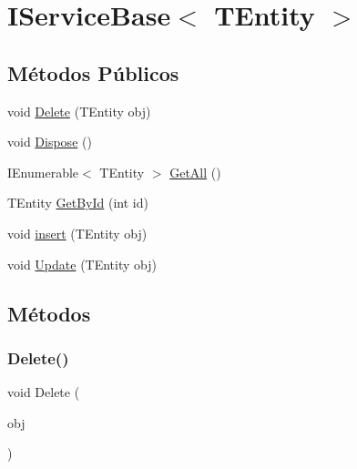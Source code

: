 \hypertarget{interfaceDomain_1_1Interfaces_1_1IServiceBase}{}\section{I\+Service\+Base$<$ T\+Entity $>$}
\label{interfaceDomain_1_1Interfaces_1_1IServiceBase}
\subsection*{Métodos Públicos}
\begin{DoxyCompactItemize}
\item 
void \hyperlink{interfaceDomain_1_1Interfaces_1_1IServiceBase_aed1520a909075057585cb4c08509840c}{Delete} (T\+Entity obj)
\item 
void \hyperlink{interfaceDomain_1_1Interfaces_1_1IServiceBase_a6e2d745cdb7a7b983f861ed6a9a541a7}{Dispose} ()
\item 
I\+Enumerable$<$ T\+Entity $>$ \hyperlink{interfaceDomain_1_1Interfaces_1_1IServiceBase_a9419e993dd7b14ea9711c035545ba3be}{Get\+All} ()
\item 
T\+Entity \hyperlink{interfaceDomain_1_1Interfaces_1_1IServiceBase_a46f8e0fa79eb922f5efbbebeb4f1788c}{Get\+By\+Id} (int id)
\item 
void \hyperlink{interfaceDomain_1_1Interfaces_1_1IServiceBase_aea7b25214718d0a8e96d77c8ee91da54}{insert} (T\+Entity obj)
\item 
void \hyperlink{interfaceDomain_1_1Interfaces_1_1IServiceBase_a6a657f225bc81497581a8919ae894bfc}{Update} (T\+Entity obj)
\end{DoxyCompactItemize}


\subsection{Métodos}
\mbox{\label{interfaceDomain_1_1Interfaces_1_1IServiceBase_aed1520a909075057585cb4c08509840c}} 
\subsubsection{\texorpdfstring{Delete()}{Delete()}}
{\footnotesize\ttfamily void Delete (\begin{DoxyParamCaption}\item[{T\+Entity}]{obj }\end{DoxyParamCaption})}

